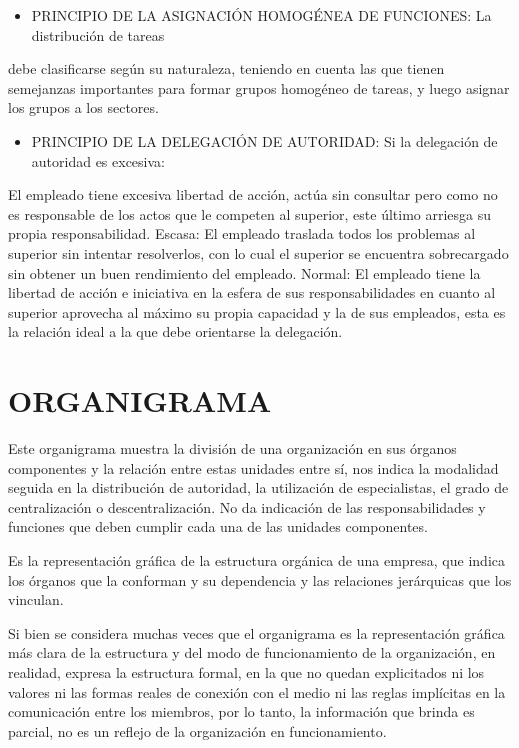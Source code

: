 \begin{itemize}
  \item PRINCIPIO DE LA ASIGNACIÓN HOMOGÉNEA DE FUNCIONES: La distribución de tareas
\end{itemize}
debe clasificarse según su naturaleza, teniendo en cuenta las que tienen semejanzas importantes para formar grupos homogéneo de tareas, y luego asignar los grupos a los sectores.



\begin{itemize}
  \item PRINCIPIO DE LA DELEGACIÓN DE AUTORIDAD: Si la delegación de autoridad es excesiva:
\end{itemize}
El empleado tiene excesiva libertad de acción, actúa sin consultar pero como no es responsable de los actos que le competen al superior, este último arriesga su propia responsabilidad. Escasa: El empleado traslada todos los problemas al superior sin intentar resolverlos, con lo cual el superior se encuentra sobrecargado sin obtener un buen rendimiento del empleado. Normal: El empleado tiene la libertad de acción e iniciativa en la esfera de sus responsabilidades en cuanto al superior aprovecha al máximo su propia capacidad y la de sus empleados, esta es la relación ideal a la que debe orientarse la delegación.

\section*{ORGANIGRAMA}
Este organigrama muestra la división de una organización en sus órganos componentes y la relación entre estas unidades entre sí, nos indica la modalidad seguida en la distribución de autoridad, la utilización de especialistas, el grado de centralización o descentralización. No da indicación de las responsabilidades y funciones que deben cumplir cada una de las unidades componentes.


\begin{recuadro}
Es la representación gráfica de la estructura orgánica de una empresa, que indica los órganos que la conforman y su dependencia y las relaciones jerárquicas que los vinculan.
\end{recuadro}

Si bien se considera muchas veces que el organigrama es la representación gráfica más clara de la estructura y del modo de funcionamiento de la organización, en realidad, expresa la estructura formal, en la que no quedan explicitados ni los valores ni las formas reales de conexión con el medio ni las reglas implícitas en la comunicación entre los miembros, por lo tanto, la información que brinda es parcial, no es un reflejo de la organización en funcionamiento.

